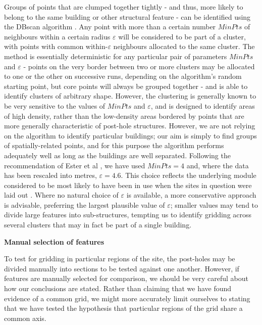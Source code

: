 \documentclass[../../ArchStats.tex]{subfiles}
\begin{document}
Groups of points that are clumped together tightly - and thus, more likely to belong to the same building or other structural feature - can be identified using the DBscan algorithm \cite{Ester1996}. Any point with more than a certain number $MinPts$ of neighbours within a certain radius $\varepsilon$ will be considered to be part of a cluster, with points with common within-$\varepsilon$ neighbours allocated to the same cluster. The method is essentially deterministic for any particular pair of parameters $MinPts$ and $\varepsilon$ - points on the very border between two or more clusters may be allocated to one or the other on successive runs, depending on the algorithm's random starting point, but core points will always be grouped together - and is able to identify clusters of arbitrary shape. However, the clustering is generally known to be very sensitive to the values of $MinPts$ and $\varepsilon$, and is designed to identify areas of high density, rather than the low-density areas bordered by points that are more generally characteristic of post-hole structures. However, we are not relying on the algorithm to identify particular buildings; our aim is simply to find groups of spatially-related points, and for this purpose the algorithm performs adequately well as long as the buildings are well separated. Following the recommendation of Ester et al \cite{Ester1996}, we have used $MinPts = 4$ and, where the data has been rescaled into metres, $\varepsilon = 4.6$. This choice reflects the underlying module considered to be most likely to have been in use when the sites in question were laid out  \cite{Blair2013}. Where no natural choice of $\varepsilon$ is available, a more conservative approach is advisable, preferring the largest plausible value of $\varepsilon$; smaller values may tend to divide large features into sub-structures, tempting us to identify gridding across several clusters that may in fact be part of a single building. 


\textbf{Manual selection of features}

To test for gridding in particular regions of the site, the post-holes may be divided manually into sections to be tested against one another. However, if features are manually selected for comparison, we should be very careful about how our conclusions are stated. Rather than claiming that we have found evidence of a common grid, we might more accurately limit ourselves to stating that we have tested the hypothesis that particular regions of the grid share a common axis.
\end{document}
